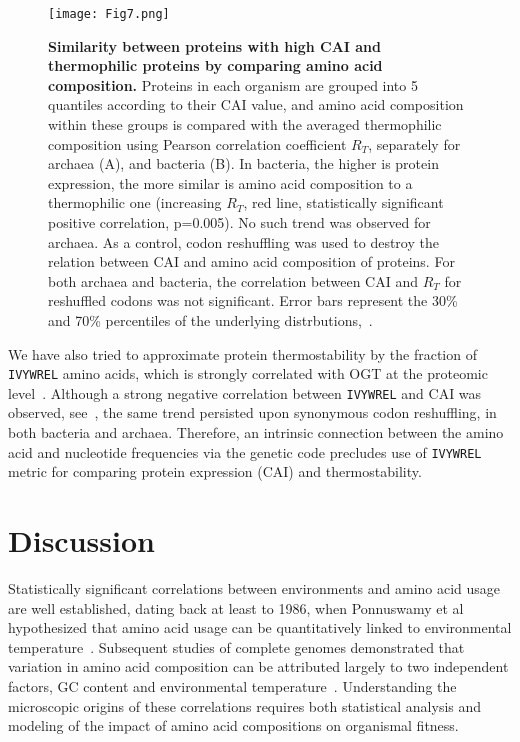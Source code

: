 \documentclass[10pt,letterpaper]{article}
\begin{document}
\begin{figure}[h!]
\texttt{[image: Fig7.png]}
\caption{
{\bf Similarity between proteins with high CAI and thermophilic proteins by comparing amino acid composition.}
Proteins in each organism are grouped into 5 quantiles according to their CAI value, and amino acid composition within these groups is compared with the averaged thermophilic composition using Pearson correlation coefficient $R_T$, separately for archaea (A), and bacteria (B). In bacteria, the higher is protein expression, the more similar is amino acid composition to a thermophilic one (increasing $R_T$, red line, statistically significant positive correlation, p=0.005). No such trend was observed for archaea. As a control, codon reshuffling was used to destroy the relation between CAI and amino acid composition of proteins. For both archaea and bacteria, the correlation between CAI and $R_T$ for reshuffled codons was not significant.  Error bars represent the 30\% and 70\% percentiles of the underlying distrbutions,~.
}
\label{fig:fig7}
\end{figure}

We have also tried to approximate protein thermostability by the fraction of \texttt{IVYWREL} amino acids, which is strongly correlated with OGT at the proteomic level~\cite{Zeldovich2007Protein}. Although a strong negative correlation between \texttt{IVYWREL} and CAI was observed, see~, the same trend persisted upon synonymous codon reshuffling, in both bacteria and archaea. Therefore, an intrinsic connection between the amino acid and nucleotide frequencies via the genetic code precludes use of \texttt{IVYWREL} metric for comparing protein expression (CAI) and thermostability.

\section*{Discussion}


Statistically significant correlations between environments and amino acid usage are well established, dating back at least to 1986, when Ponnuswamy et al hypothesized that amino acid usage can be quantitatively linked to environmental temperature~\cite{Ponnuswamy1986Amino}. Subsequent studies of complete genomes demonstrated that variation in amino acid composition can be attributed largely to two independent factors,  GC content and environmental  temperature~\cite{Kreil2001Identification,Singer2003Thermophilic}. Understanding the microscopic origins of these correlations requires both statistical analysis and modeling of the impact of amino acid compositions on organismal fitness. 
\end{document}
